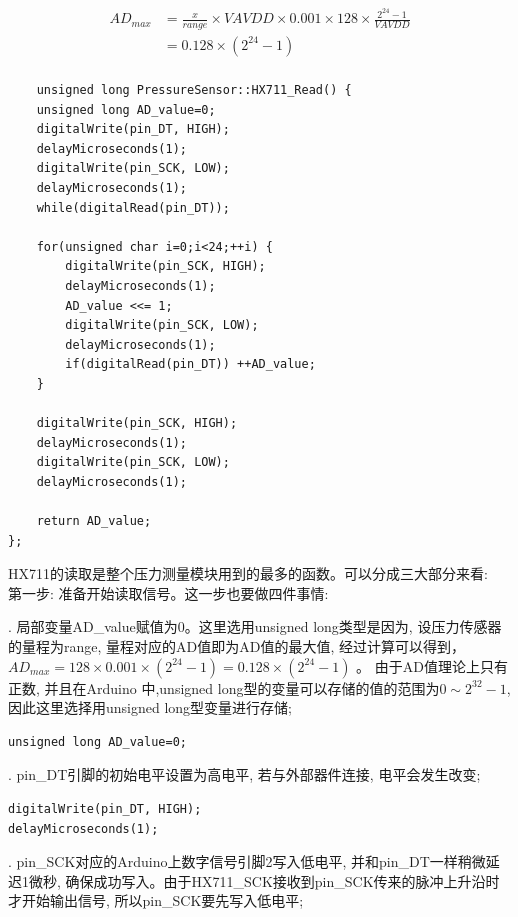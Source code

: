 \documentclass{article}
\begin{document}
\begin{equation}
	\begin{aligned}
		AD_{max} &= \frac{x}{range} \times VAVDD \times 0.001 \times 128 \times \frac{2^{24}-1}{VAVDD} \\
	     		 &= 0.128 \times (2^{24}-1)\\
	\end{aligned}
\end{equation}

\begin{lstlisting}
	unsigned long PressureSensor::HX711_Read() {
  	unsigned long AD_value=0;
	digitalWrite(pin_DT, HIGH);
	delayMicroseconds(1);
	digitalWrite(pin_SCK, LOW);
	delayMicroseconds(1);
	while(digitalRead(pin_DT)); 
	
	for(unsigned char i=0;i<24;++i) {
		digitalWrite(pin_SCK, HIGH); 
		delayMicroseconds(1);
		AD_value <<= 1; 
		digitalWrite(pin_SCK, LOW); 
		delayMicroseconds(1);
		if(digitalRead(pin_DT)) ++AD_value; 
	}
	
	digitalWrite(pin_SCK, HIGH); 
	delayMicroseconds(1);
	digitalWrite(pin_SCK, LOW); 
	delayMicroseconds(1);

	return AD_value;
};
\end{lstlisting}

HX711的读取是整个压力测量模块用到的最多的函数。可以分成三大部分来看:\\
\noindent 第一步: 准备开始读取信号。这一步也要做四件事情:

\noindent \uppercase\expandafter{}. 局部变量AD\_value赋值为0。这里选用unsigned long类型是因为, 
设压力传感器的量程为range, 量程对应的AD值即为AD值的最大值, 经过计算可以得到，$AD_{max} = 128 \times 0.001 \times (2^{24}-1) = 0.128 \times (2^{24}-1)$ 。
由于AD值理论上只有正数, 并且在Arduino 中,unsigned long型的变量可以存储的值的范围为$0\sim2^{32}-1$,
因此这里选择用unsigned long型变量进行存储;

\begin{lstlisting}
unsigned long AD_value=0;
\end{lstlisting}	

\noindent \uppercase\expandafter{}. pin\_DT引脚的初始电平设置为高电平, 若与外部器件连接, 电平会发生改变;

\begin{lstlisting}
digitalWrite(pin_DT, HIGH);
delayMicroseconds(1);
\end{lstlisting}	

\noindent \uppercase\expandafter{}. pin\_SCK对应的Arduino上数字信号引脚2写入低电平, 
并和pin\_DT一样稍微延迟1微秒, 确保成功写入。由于HX711\_SCK接收到pin\_SCK传来的脉冲上升沿时才开始输出信号,
所以pin\_SCK要先写入低电平;
\end{document}
